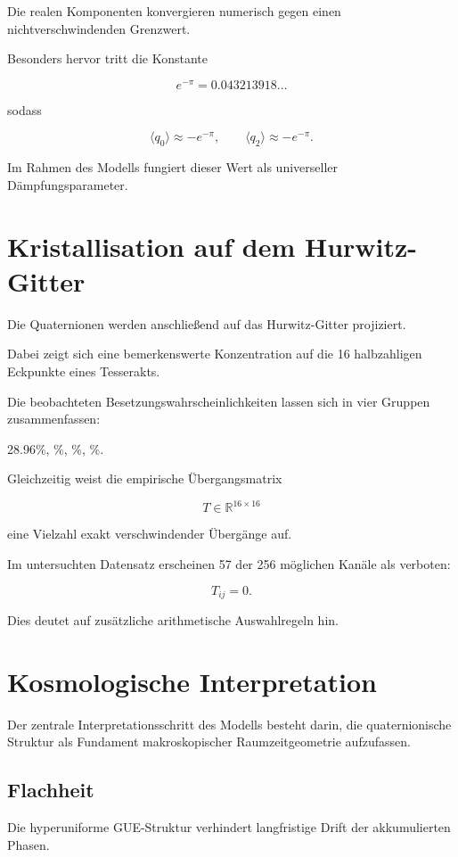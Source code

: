 \documentclass[11pt,a4paper]{article}
\begin{document}
Die realen Komponenten konvergieren numerisch gegen einen nichtverschwindenden Grenzwert.

Besonders hervor tritt die Konstante

\[
e^{-\pi}=0.043213918\ldots
\]

sodass

\[
\langle q_0\rangle \approx -e^{-\pi},\qquad
\langle q_2\rangle \approx -e^{-\pi}.
\]

Im Rahmen des Modells fungiert dieser Wert als universeller Dämpfungsparameter.

\section{Kristallisation auf dem Hurwitz-Gitter}

Die Quaternionen werden anschließend auf das Hurwitz-Gitter projiziert.

Dabei zeigt sich eine bemerkenswerte Konzentration auf die 16 halbzahligen Eckpunkte eines Tesserakts.

Die beobachteten Besetzungswahrscheinlichkeiten lassen sich in vier Gruppen zusammenfassen:

28.96\%,
\%,
\%,
\%.

Gleichzeitig weist die empirische Übergangsmatrix

\[
T\in \mathbb{R}^{16\times16}
\]

eine Vielzahl exakt verschwindender Übergänge auf.

Im untersuchten Datensatz erscheinen 57 der 256 möglichen Kanäle als verboten:

\[
T_{ij}=0.
\]

Dies deutet auf zusätzliche arithmetische Auswahlregeln hin.

\section{Kosmologische Interpretation}

Der zentrale Interpretationsschritt des Modells besteht darin, die quaternionische Struktur als Fundament makroskopischer Raumzeitgeometrie aufzufassen.

\subsection{Flachheit}

Die hyperuniforme GUE-Struktur verhindert langfristige Drift der akkumulierten Phasen.
\end{document}
